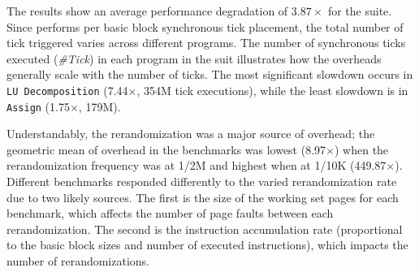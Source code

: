 The results show an average performance degradation of $3.87\times$ for the \nbench suite.
Since \thename performs per basic block synchronous tick placement, the total number of tick triggered varies across different programs.
The number of synchronous ticks executed (\emph{\#Tick}) in each program in the suit illustrates how the overheads generally scale with the number of ticks.
The most significant slowdown occurs in \texttt{LU Decomposition} (7.44$\times$, 354M tick executions), while the least slowdown is in \texttt{Assign} (1.75$\times$, 179M).



Understandably, the rerandomization was a major source of overhead; the geometric mean of overhead in the benchmarks was lowest (8.97$\times$) when the rerandomization frequency was at 1/2M and highest when at 1/10K (449.87$\times$).
Different benchmarks responded differently to the varied rerandomization rate due to two likely sources.
The first is the size of the working set pages for each benchmark, which affects the number of page faults between each rerandomization.
The second is the instruction accumulation rate (proportional to the basic block sizes and number of executed instructions), which impacts the number of rerandomizations.




